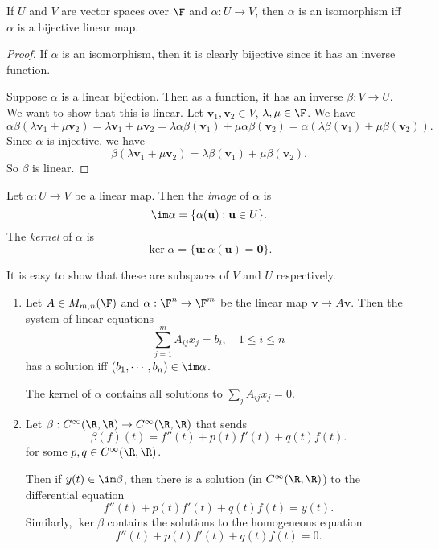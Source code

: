\documentclass[a4paper]{article}
\begin{document}
\begin{lemma}
  If $U$ and $V$ are vector spaces over $\F$ and $\alpha: U\to V$, then $\alpha$ is an isomorphism iff $\alpha$ is a bijective linear map.
\end{lemma}

\begin{proof}
  If $\alpha$ is an isomorphism, then it is clearly bijective since it has an inverse function.

  Suppose $\alpha$ is a linear bijection. Then as a function, it has an inverse $\beta: V\to U$. We want to show that this is linear. Let $\mathbf{v}_1, \mathbf{v}_2 \in V$, $\lambda, \mu \in \F$. We have
  \[
    \alpha \beta(\lambda \mathbf{v}_1 + \mu \mathbf{v}_2) = \lambda \mathbf{v}_1 + \mu \mathbf{v}_2 = \lambda \alpha \beta (\mathbf{v}_1) + \mu \alpha \beta (\mathbf{v}_2) = \alpha (\lambda \beta(\mathbf{v}_1) + \mu \beta (\mathbf{v}_2)).
  \]
  Since $\alpha$ is injective, we have
  \[
    \beta(\lambda \mathbf{v}_1 + \mu \mathbf{v}_2) = \lambda \beta (\mathbf{v}_1) + \mu \beta (\mathbf{v}_2).
  \]
  So $\beta$ is linear.
\end{proof}

\begin{defi}
  Let $\alpha: U\to V$ be a linear map. Then the \emph{image} of $\alpha$ is
  \[
    \im \alpha = \{\alpha (\mathbf{u}): \mathbf{u}\in U\}.
  \]
  The \emph{kernel} of $\alpha$ is
  \[
    \ker \alpha = \{\mathbf{u}: \alpha (\mathbf{u}) = \mathbf{0}\}.
  \]
\end{defi}
It is easy to show that these are subspaces of $V$ and $U$ respectively.

\begin{eg}\leavevmode
  \begin{enumerate}
    \item Let $A\in M_{m, n}(\F)$ and $\alpha: \F^n \to \F^m$ be the linear map $\mathbf{v}\mapsto A\mathbf{v}$. Then the system of linear equations
      \[
        \sum_{j = 1}^m A_{ij}x_j = b_i,\quad 1 \leq i \leq n
      \]
      has a solution iff $(b_1, \cdots, b_n) \in \im \alpha$.

      The kernel of $\alpha$ contains all solutions to $\sum_j A_{ij}x_j = 0$.
    \item Let $\beta: C^{\infty}(\R, \R) \to C^{\infty}(\R, \R)$ that sends
      \[
        \beta(f)(t) = f''(t) + p(t) f'(t) + q(t) f(t).
      \]
      for some $p, q\in C^{\infty}(\R, \R)$.

      Then if $y(t) \in \im \beta$, then there is a solution (in $C^\infty (\R, \R)$) to the differential equation
      \[
        f''(t) + p(t) f'(t) + q(t) f(t) = y(t).
      \]
      Similarly, $\ker \beta$ contains the solutions to the homogeneous equation
      \[
        f''(t) + p(t) f'(t) + q(t) f(t) = 0.
      \]
  \end{enumerate}
\end{eg}
\end{document}
